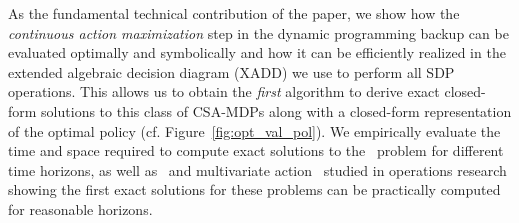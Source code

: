 As the fundamental technical contribution of the paper, we
show how the \emph{continuous action maximization} step in the dynamic
programming backup can be evaluated optimally and symbolically and how
it can be efficiently realized in the extended algebraic decision diagram (XADD)
we use to perform all SDP operations.  This
allows us to obtain the \emph{first} algorithm to derive exact closed-form
solutions to this class of CSA-MDPs along with a closed-form
representation of the optimal policy
(cf. Figure~\ref{fig:opt_val_pol}).  
We empirically evaluate the time and space required to compute exact
solutions to the \MarsRover\ problem for different time horizons, as
well as \WaterReservoir\ and multivariate action \InventoryControl\
studied in operations research showing the first exact solutions for
these problems can be practically computed for reasonable horizons.

